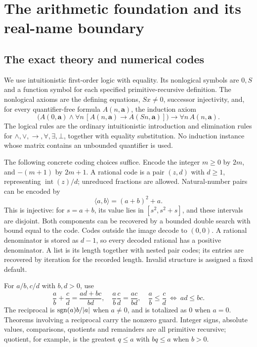 \section{The arithmetic foundation and its real-name boundary}
\label{sec:foundations}

\subsection{The exact theory and numerical codes}

We use intuitionistic first-order logic with equality. Its nonlogical symbols are $0,S$ and a function symbol for each specified primitive-recursive definition. The nonlogical axioms are the defining equations, $Sx\ne0$, successor injectivity, and, for every quantifier-free formula $A(n,\mathbf a)$, the induction axiom
\[
 \bigl(A(0,\mathbf a)\wedge
   \forall n\,[A(n,\mathbf a)\to A(Sn,\mathbf a)]\bigr)
       \longrightarrow \forall n\,A(n,\mathbf a).
\]
The logical rules are the ordinary intuitionistic introduction and elimination rules for $\wedge,\vee,\to,\forall,\exists,\bot$, together with equality substitution. No induction instance whose matrix contains an unbounded quantifier is used.

The following concrete coding choices suffice. Encode the integer $m\ge0$ by $2m$, and $-(m+1)$ by $2m+1$. A rational code is a pair $(z,d)$ with $d\ge1$, representing $\operatorname{int}(z)/d$; unreduced fractions are allowed. Natural-number pairs can be encoded by
\[
 \langle a,b\rangle=(a+b)^2+a.
\]
This is injective: for $s=a+b$, its value lies in $[s^2,s^2+s]$, and these intervals are disjoint. Both components can be recovered by a bounded double search with bound equal to the code. Codes outside the image decode to $(0,0)$. A rational denominator is stored as $d-1$, so every decoded rational has a positive denominator. A list is its length together with nested pair codes; its entries are recovered by iteration for the recorded length. Invalid structure is assigned a fixed default.

For $a/b,c/d$ with $b,d>0$, use
\[
 \frac ab+\frac cd=\frac{ad+bc}{bd},\quad
 \frac ab\frac cd=\frac{ac}{bd},\quad
 \frac ab\le\frac cd\ \Longleftrightarrow\ ad\le bc.
\]
The reciprocal is $\operatorname{sgn}(a)b/|a|$ when $a\ne0$, and is totalized as $0$ when $a=0$. Theorems involving a reciprocal carry the nonzero guard. Integer signs, absolute values, comparisons, quotients and remainders are all primitive recursive; quotient, for example, is the greatest $q\le a$ with $bq\le a$ when $b>0$.

